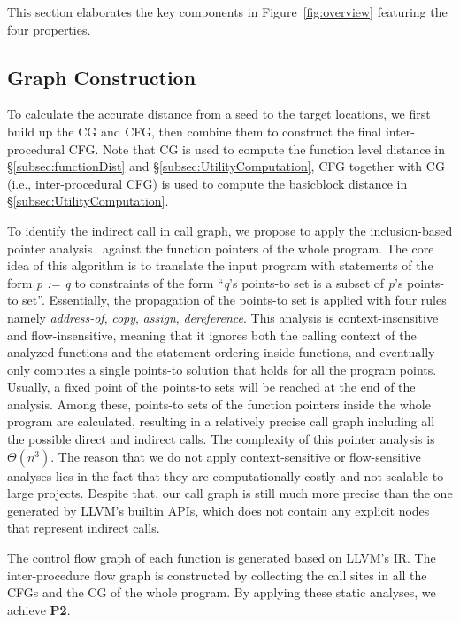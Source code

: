 This section elaborates the key components in Figure~\ref{fig:overview} featuring the four properties.


\subsection{Graph Construction} \label{subsec:graghCons}

To calculate the accurate distance from a seed to the target locations, we first build up the CG and CFG, then combine them to construct the final inter-procedural CFG. Note that CG is used to compute the function level distance in \S\ref{subsec:functionDist} and \S\ref{subsec:UtilityComputation}, CFG together with CG (i.e., inter-procedural CFG) is used to compute the basicblock distance in \S\ref{subsec:UtilityComputation}.




To identify the indirect call in call graph, we propose to apply the inclusion-based pointer analysis~\cite{Andersen94programanalysis} against the function pointers of the whole program. The core idea of this algorithm is to translate the input program with statements of the form \emph{p := q} to constraints of the form ``\emph{q}'s points-to set is a subset of \emph{p}'s points-to set''. 
Essentially, the propagation of the points-to set is applied with four rules namely \emph{address-of}, \emph{copy}, \emph{assign}, \emph{dereference}. This analysis is context-insensitive and flow-insensitive, meaning that it ignores both the calling context of the analyzed functions and the statement ordering inside functions, and eventually only computes a single points-to solution that holds for all the program points. Usually, a fixed point of the points-to sets will be reached at the end of the analysis. Among these, points-to sets of the function pointers inside the whole program are calculated, resulting in a relatively precise call graph including all the possible direct and indirect calls. The complexity of this pointer analysis is $\Theta(n^3)$.
The reason that we do not apply context-sensitive or flow-sensitive analyses lies in the fact that they are computationally costly and not scalable to large projects. Despite that, our call graph is still much more precise than the one generated by LLVM's builtin APIs, which does not contain any explicit nodes that represent indirect calls. 

The control flow graph of each function is generated based on LLVM's IR. The inter-procedure flow graph is constructed by collecting the call sites in all the CFGs and the CG of the whole program.  By applying these static analyses, we achieve \textbf{P2}.




